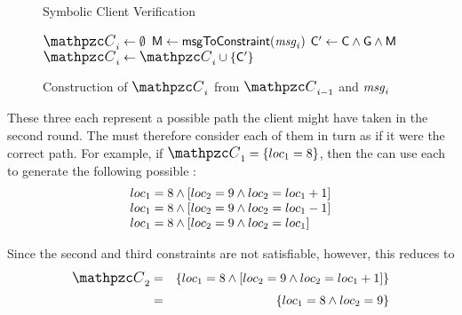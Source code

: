 \begin{figure}[t]
\centering
\begin{minipage}{\textwidth}
\begin{algorithm}[H] %
  \caption{Symbolic Client Verification}
\begin{algorithmic}[1]
  \State $\execPathConstraints_{\roundidx} \gets \emptyset$
  \State $\mathsf M\space \gets \mathsf{msgToConstraint}(\mathit{msg}_{i})$ \label{fig:trackConstraints:msgConstraint}
  \For{$\genericPathConstraint \in \genericPathConstraints(\roundidx)$}
        \State $\mathsf C' \gets \mathsf C \wedge \mathsf G \wedge \mathsf M\space$ \label{fig:trackConstraints:newConst}
        \If{$\isSatisfiable(\newExecPathConstraint)$} \label{fig:trackConstraints:isSat}
           \State $\execPathConstraints_{\roundidx} \gets \execPathConstraints_{\roundidx} \cup \{\newExecPathConstraint\}$ \label{fig:trackConstraints:accumulate}
        \EndIf
     \EndFor
  \EndFor
  \EndProcedure
\end{algorithmic}
\end{algorithm}
\end{minipage}
\caption{Construction of $\execPathConstraints_{\roundidx}$ from $\execPathConstraints_{\roundidx-1}$ and $\mathit{msg}_{i}$}
\label{fig:trackConstraints}
\end{figure}

These three \pathsegcons each represent a possible path the client
might have taken in the second round.  The \verifier must therefore
consider each of them in turn as if it were the correct path.  For
example, if $\execPathConstraints_1 = \{\toyloc_1 = 8\}$, then the
\verifier can use each \pathsegcon to generate the following possible
\execpathcons:
\[\begin{array}{l}
loc_1 = 8 \wedge [loc_2 = 9 \wedge loc_2 = loc_1+1]\\
loc_1 = 8 \wedge [loc_2 = 9 \wedge loc_2 = loc_1-1]\\
loc_1 = 8 \wedge [loc_2 = 9 \wedge loc_2 = loc_1]
\end{array}
\]

Since the second and third constraints are not satisfiable, however,
this reduces to
\begin{eqnarray*}
\execPathConstraints_2 
& = & \{\toyloc_1 = 8 \wedge [\toyloc_2 = 9 \wedge \toyloc_2 = \toyloc_1+1]\} \\
& = & \{\toyloc_1 = 8 \wedge \toyloc_2 = 9\}
\end{eqnarray*}

